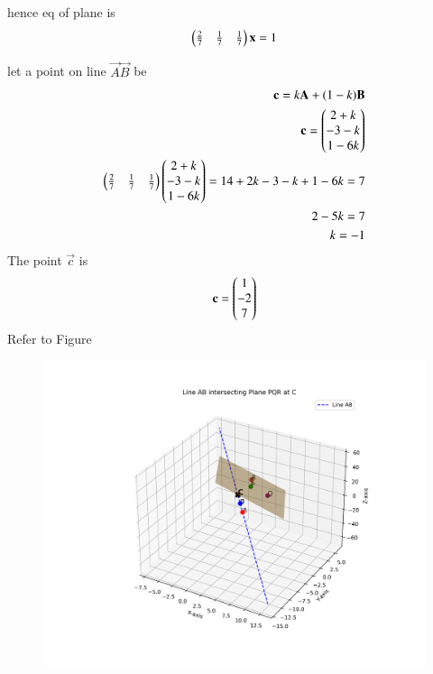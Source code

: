 \documentclass[journal]{IEEEtran}
\begin{document}
hence eq of plane is
\begin{align}
 \begin{pmatrix}\tfrac{2}{7} & \tfrac{1}{7} & \tfrac{1}{7}\end{pmatrix} 
 \mathbf{x}
 =1
\end{align}   


let a point on line $\vec{A}\vec{B}$ be 
\begin{align}
\mathbf{c}=k\mathbf{A}+(1-k)\mathbf{B}\\
\mathbf{c}=\begin{pmatrix}2+k
               \\
              -3-k
              \\
              1-6k
 \end{pmatrix}\\
\begin{pmatrix}\tfrac{2}{7} & \tfrac{1}{7} & \tfrac{1}{7}\end{pmatrix} 
\begin{pmatrix}2+k
               \\
              -3-k
              \\
              1-6k
              \end{pmatrix}
 =1
 4+2k-3-k+1-6k=7\\
2-5k=7\\
k=-1
\end{align}
The point $\vec{c}$ is
\begin{align}
    \mathbf{c}=\begin{pmatrix}1
                   \\
                   -2
                   \\
                   7
             \end{pmatrix}
\end{align}
Refer to Figure

\begin{figure}[H]
\begin{center}
\includegraphics[width=0.6\columnwidth]{figs/graph8.png}
\end{center}
\caption{}
\label{fig:Fig}
\end{figure}
\end{document}
